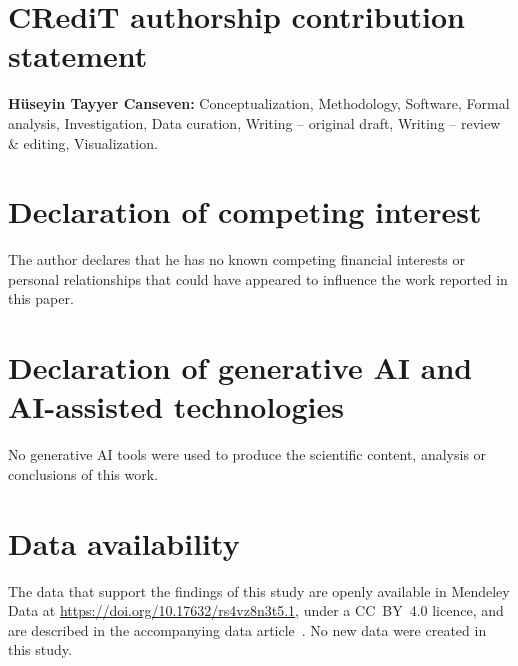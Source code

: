 \documentclass[preprint,review,3p,number]{elsarticle}
\begin{document}









\section*{CRediT authorship contribution statement}
\textbf{H\"useyin Tayyer Canseven:} Conceptualization, Methodology, Software,
Formal analysis, Investigation, Data curation, Writing -- original draft,
Writing -- review \& editing, Visualization.

\section*{Declaration of competing interest}
The author declares that he has no known competing financial interests or
personal relationships that could have appeared to influence the work reported
in this paper.

\section*{Declaration of generative AI and AI-assisted technologies}
No generative AI tools were used to produce the scientific content, analysis or
conclusions of this work.

\section*{Data availability}
The data that support the findings of this study are openly available in
Mendeley Data at \url{https://doi.org/10.17632/rs4vz8n3t5.1}, under a CC~BY~4.0
licence, and are described in the accompanying data
article~\cite{ertargin2026smartphone, ertargin2026dataset}. No new data were
created in this study.



\end{document}
